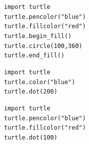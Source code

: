 \documentclass[11pt]{ctexart}
\begin{document}
\begin{enumerate}
\begin{tasks}
            \task
            \lstinline!import turtle! \\
            \lstinline!turtle.pencolor("blue")! \\
            \lstinline!turtle.fillcolor("red")! \\
            \lstinline!turtle.begin_fill()! \\
            \lstinline!turtle.circle(100,360)! \\
            \lstinline!turtle.end_fill()!

            \task 
            \lstinline!import turtle! \\
            \lstinline!turtle.color("blue")! \\
            \lstinline!turtle.dot(200)! 

            \task
            \lstinline!import turtle! \\
            \lstinline!turtle.pencolor("blue")! \\
            \lstinline!turtle.fillcolor("red")! \\
            \lstinline!turtle.dot(100)! 
        \end{tasks}
    \end{enumerate}
\end{document}
